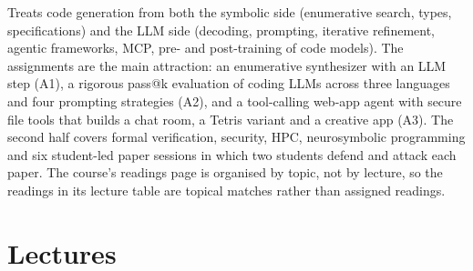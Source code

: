 \documentclass[10pt,oneside]{report}
\begin{document}
Treats code generation from both the symbolic side (enumerative search, types, specifications) and the LLM side (decoding, prompting, iterative refinement, agentic frameworks, MCP, pre- and post-training of code models).
The assignments are the main attraction: an enumerative synthesizer with an LLM step (A1), a rigorous pass@k evaluation of coding LLMs across three languages and four prompting strategies (A2), and a tool-calling web-app agent with secure file tools that builds a chat room, a Tetris variant and a creative app (A3).
The second half covers formal verification, security, HPC, neurosymbolic programming and six student-led paper sessions in which two students defend and attack each paper.
The course's readings page is organised by topic, not by lecture, so the readings in its lecture table are topical matches rather than assigned readings.
\section{Lectures}
\end{document}
